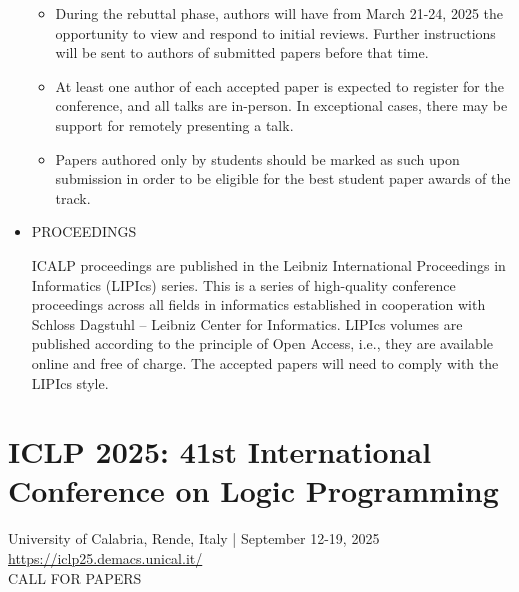 \documentclass[prodmode,acmtecs]{acmsmall} %
\begin{document}
\begin{itemize}
\begin{itemize}
\item  During the rebuttal phase, authors will have from March 21-24, 2025 the opportunity to view and respond to initial reviews. Further instructions will be sent to authors of submitted papers before that time.
\item  At least one author of each accepted paper is expected to register for the conference, and all talks are in-person. In exceptional cases, there may be support for remotely presenting a talk.
\item  Papers authored only by students should be marked as such upon submission in order to be eligible for the best student paper awards of the track.
\end{itemize} 
\item  PROCEEDINGS  
 
  ICALP proceedings are published in the Leibniz International Proceedings in Informatics (LIPIcs) series. This is a series of high-quality conference proceedings across all fields in informatics established in cooperation with Schloss Dagstuhl – Leibniz Center for Informatics. LIPIcs volumes are published according to the principle of Open Access, i.e., they are available online and free of charge. The accepted papers will need to comply with the LIPIcs style. 
 
\end{itemize}\section{ICLP 2025: 41st International Conference on Logic Programming }\label{ICLP2025}  University of Calabria, Rende, Italy | September 12-19, 2025\\ 
  \href{https://iclp25.demacs.unical.it/}{https://iclp25.demacs.unical.it/}\\ 
CALL FOR PAPERS  
\end{document}
